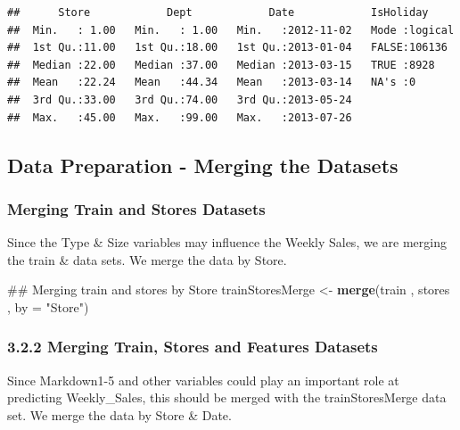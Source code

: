 \documentclass[]{article}
\newenvironment{Shaded}{\begin{snugshade}}{\end{snugshade}}
\newcommand{\KeywordTok}[1]{\textcolor[rgb]{0.13,0.29,0.53}{\textbf{{#1}}}}
\newcommand{\DataTypeTok}[1]{\textcolor[rgb]{0.13,0.29,0.53}{{#1}}}
\newcommand{\StringTok}[1]{\textcolor[rgb]{0.31,0.60,0.02}{{#1}}}
\newcommand{\NormalTok}[1]{{#1}}
\begin{document}
\begin{verbatim}
##      Store            Dept            Date            IsHoliday      
##  Min.   : 1.00   Min.   : 1.00   Min.   :2012-11-02   Mode :logical  
##  1st Qu.:11.00   1st Qu.:18.00   1st Qu.:2013-01-04   FALSE:106136   
##  Median :22.00   Median :37.00   Median :2013-03-15   TRUE :8928     
##  Mean   :22.24   Mean   :44.34   Mean   :2013-03-14   NA's :0        
##  3rd Qu.:33.00   3rd Qu.:74.00   3rd Qu.:2013-05-24                  
##  Max.   :45.00   Max.   :99.00   Max.   :2013-07-26
\end{verbatim}

\pagebreak

\subsection{Data Preparation - Merging the
Datasets}\label{data-preparation---merging-the-datasets}

\subsubsection{Merging Train and Stores
Datasets}\label{merging-train-and-stores-datasets}

Since the Type \& Size variables may influence the Weekly Sales, we are
merging the train \& data sets. We merge the data by Store.

\begin{Shaded}
\begin{Highlighting}[]
\NormalTok{## Merging train and stores by Store}
\NormalTok{trainStoresMerge <-}\StringTok{ }\KeywordTok{merge}\NormalTok{(train , stores , }\DataTypeTok{by =} \StringTok{"Store"}\NormalTok{)}
\end{Highlighting}
\end{Shaded}

\subsubsection{3.2.2 Merging Train, Stores and Features
Datasets}\label{merging-train-stores-and-features-datasets}

Since Markdown1-5 and other variables could play an important role at
predicting Weekly\_Sales, this should be merged with the
trainStoresMerge data set. We merge the data by Store \& Date.
\end{document}

